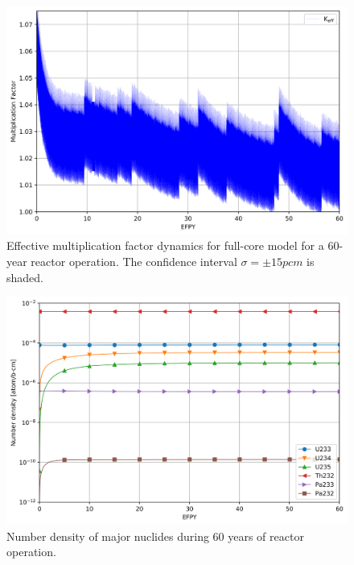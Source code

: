 \documentclass[review]{elsarticle}
\begin{document}
\begin{figure}[htbp!]
    \begin{center}
		\includegraphics[width=\textwidth]{keff.png}
    \end{center}
	\caption{Effective multiplication factor dynamics for full-core model for a 60-year reactor operation. The confidence interval $\sigma=\pm15pcm$ is shaded.}
	\label{fig:keff}
\end{figure}
\begin{figure}[htbp!]
    \begin{center}
		\includegraphics[width=\textwidth]{major_isotopes_adens.png}
    \end{center}
	\caption{Number density of major nuclides during 60 years of reactor operation.}
	\label{fig:adens_eq}
\end{figure}
\end{document}
